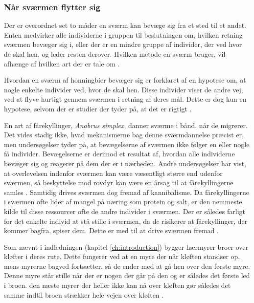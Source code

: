 \subsubsection{Når sværmen flytter sig}
Der er overordnet set to måder en sværm kan bevæge sig fra et sted til et andet. Enten medvirker alle individerne i gruppen til beslutningen om, hvilken retning sværmen bevæger sig i, eller der er en mindre gruppe af individer, der ved hvor de skal hen, og leder resten derover. Hvilken metode en sværm bruger, vil afhænge af hvilken art der er tale om \cite{beekman2008biological}.
\par
Hvordan en sværm af honningbier bevæger sig er forklaret af en hypotese om, at nogle enkelte individer ved, hvor de skal hen. Disse individer viser de andre vej, ved at flyve hurtigt gennem sværmen i retning af deres mål. Dette er dog kun en hypotese, selvom der er studier der tyder på, at det er rigtigt \cite{beekman2006}. 
\par
En art af fårekyllinger, \textit{Anabrus simplex}, danner sværme i bånd, når de migrerer. Det vides stadig ikke, hvad mekanismerne bag denne sværmdannelse præcist er, men undersøgelser tyder på, at bevægelserne af sværmen ikke følger en eller nogle få individer. Bevægelserne er derimod et resultat af, hvordan alle individerne bevæger sig og reagerer på dem der er i nærheden. Andre undersøgelser har vist, at overlevelsen indenfor sværmen kan være væsentligt større end udenfor sværmen, så beskyttelse mod rovdyr kan være en årsag til at fårekyllingerne samles \cite{beekman2008biological}. Samtidig drives sværmen dog fremad af kannibalisme. Da fårekyllingerne i sværmen ofte lider af mangel på næring som protein og salt, er den nemmeste kilde til disse ressourcer ofte de andre individer i sværmen. Der er således farligt for det enkelte individ at stå stille i sværmen, da de risikerer at fårekyllinger, der kommer bagfra, spiser dem. Dette er med til at drive sværmen fremad \cite{beekman2008biological}. 
\par
Som nævnt i indledningen (kapitel \ref{ch:introduction}) bygger hærmyrer broer over kløfter i deres rute. Dette fungerer ved at en myre der når kløften standser op, mens myrerne bagved fortsætter, så de ender med at gå hen over den første myre. Denne myre står stille når der er nogen der går på den og er således det første led i broen. den næste myrer der heller ikke kan nå over kløften gør således det samme indtil broen strækker hele vejen over kløften \cite{armyants}.


